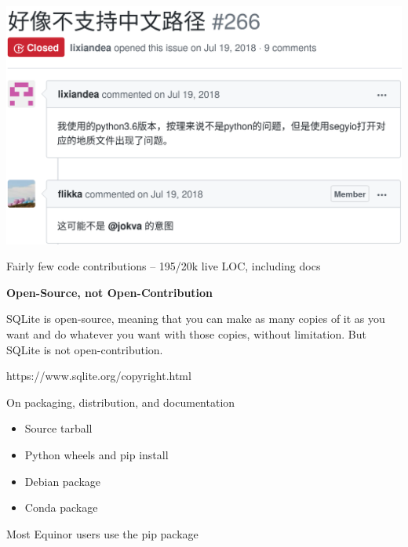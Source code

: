 \documentclass[pdf]{beamer}
\begin{document}
\begin{frame}
    \includegraphics[width=\textwidth, keepaspectratio]{img/segyio-sino}
\end{frame}

\begin{frame}
    Fairly few code contributions -- 195/20k live LOC, including docs
\end{frame}

\begin{frame}
    \textbf{Open-Source, not Open-Contribution}
    \begin{displayquote}
        SQLite is open-source, meaning that you can make as many copies of it as you
        want and do whatever you want with those copies, without limitation. But SQLite
        is not open-contribution.
    \end{displayquote}

    https://www.sqlite.org/copyright.html
\end{frame}

\begin{frame}
    \begin{center}
        On packaging, distribution, and documentation
    \end{center}
\end{frame}

\begin{frame}
    \begin{itemize}
        \item Source tarball
        \item Python wheels and pip install
        \item Debian package
        \item Conda package
    \end{itemize}
    Most Equinor users use the pip package
\end{frame}
\end{document}
